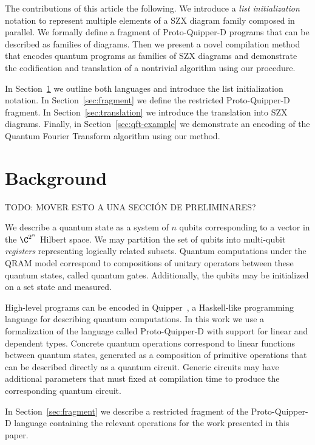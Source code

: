 The contributions of this article the following. We introduce a \textit{list initialization} notation to represent multiple elements of a SZX diagram family composed in parallel. We formally define a fragment of Proto-Quipper-D programs that can be described as families of diagrams. Then we present a novel compilation method that encodes quantum programs as families of SZX diagrams and demonstrate the codification and translation of a nontrivial algorithm using our procedure.

In Section~\ref{sec:background} we outline both languages and introduce the list initialization notation. In Section~\ref{sec:fragment} we define the restricted Proto-Quipper-D fragment. In Section~\ref{sec:translation} we introduce the translation into SZX diagrams. Finally, in Section~\ref{sec:qft-example} we demonstrate an encoding of the Quantum Fourier Transform algorithm using our method.

\section{Background}%
\label{sec:background}

{\color{red}TODO: MOVER ESTO A UNA SECCIÓN DE PRELIMINARES?}

We describe a quantum state as a system of $n$ qubits corresponding to a vector in the $\C^{2^n}$ Hilbert space. We may partition the set of qubits into multi-qubit \textit{registers} representing logically related subsets. Quantum computations under the QRAM model correspond to compositions of unitary operators between these quantum states, called quantum gates. Additionally, the qubits may be initialized on a set state and measured.

High-level programs can be encoded in Quipper~\cite{Green2013quipper}, a Haskell-like programming language for describing quantum computations. In this work we use a formalization of the language called Proto-Quipper-D\cite{fu_tutorial_2020} with support for linear and dependent types. Concrete quantum operations correspond to linear functions between quantum states, generated as a composition of primitive operations that can be described directly as a quantum circuit. Generic circuits may have additional parameters that must fixed at compilation time to produce the corresponding quantum circuit.

In Section~\ref{sec:fragment} we describe a restricted fragment of the Proto-Quipper-D language containing the relevant operations for the work presented in this paper.

